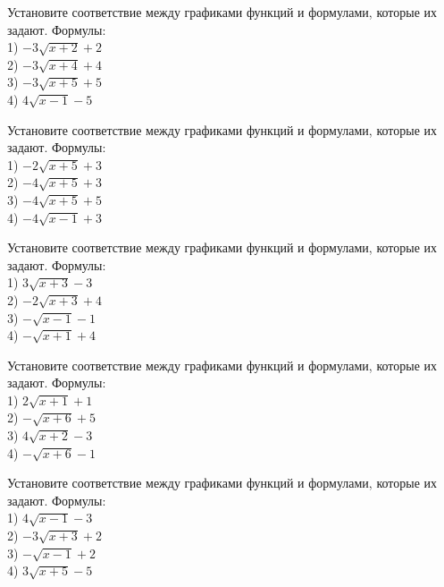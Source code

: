 \documentclass[4apaper]{article}
\begin{document}
\begin{taskBN}{81}
Установите соответствие между графиками функций и формулами, которые их задают. Формулы: \\1) $-3\sqrt{x+2}+2$\\2) $-3\sqrt{x+4}+4$\\3) $-3\sqrt{x+5}+5$\\4) $4\sqrt{x-1}-5$
\end{taskBN}

\begin{taskBN}{82}
Установите соответствие между графиками функций и формулами, которые их задают. Формулы: \\1) $-2\sqrt{x+5}+3$\\2) $-4\sqrt{x+5}+3$\\3) $-4\sqrt{x+5}+5$\\4) $-4\sqrt{x-1}+3$
\end{taskBN}

\begin{taskBN}{83}
Установите соответствие между графиками функций и формулами, которые их задают. Формулы: \\1) $3\sqrt{x+3}-3$\\2) $-2\sqrt{x+3}+4$\\3) $-\sqrt{x-1}-1$\\4) $-\sqrt{x+1}+4$
\end{taskBN}

\begin{taskBN}{84}
Установите соответствие между графиками функций и формулами, которые их задают. Формулы: \\1) $2\sqrt{x+1}+1$\\2) $-\sqrt{x+6}+5$\\3) $4\sqrt{x+2}-3$\\4) $-\sqrt{x+6}-1$
\end{taskBN}

\begin{taskBN}{85}
Установите соответствие между графиками функций и формулами, которые их задают. Формулы: \\1) $4\sqrt{x-1}-3$\\2) $-3\sqrt{x+3}+2$\\3) $-\sqrt{x-1}+2$\\4) $3\sqrt{x+5}-5$
\end{taskBN}
\end{document}
